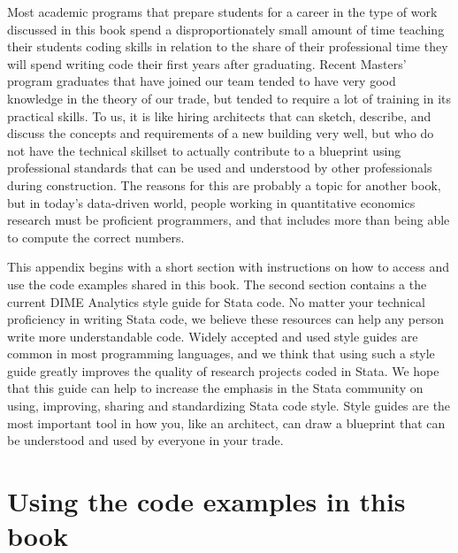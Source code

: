 
\begin{fullwidth}

Most academic programs that prepare students for a career
in the type of work discussed in this book
spend a disproportionately small amount of time teaching their students coding skills
in relation to the share of their professional time they will spend writing code
their first years after graduating.
Recent Masters' program graduates that have joined our team
tended to have very good knowledge in the theory of our
trade, but tended to require a lot of training in its practical skills.
To us, it is like hiring architects that can sketch, describe, and discuss
the concepts and requirements of a new building very well,
but who do not have the technical skillset
to actually contribute to a blueprint using professional standards
that can be used and understood by other professionals during construction.
The reasons for this are probably a topic for another book,
but in today's data-driven world,
people working in quantitative economics research must be proficient programmers,
and that includes more than being able to compute the correct numbers.

This appendix begins with a short section with instructions
on how to access and use the code examples shared in this book.
The second section contains a the current DIME Analytics style guide for Stata code.
No matter your technical proficiency in writing Stata code,
we believe these resources can help any person write more understandable code.
Widely accepted and used style guides are common in most programming languages,
and we think that using such a style guide greatly improves the quality
of research projects coded in Stata.
We hope that this guide can  help to increase the emphasis in the Stata community
on using, improving, sharing and standardizing Stata code style.
Style guides are the most important tool in how you, like an architect,
can draw a blueprint that can be understood and used by everyone in your trade.

\end{fullwidth}


\section{Using the code examples in this book}

